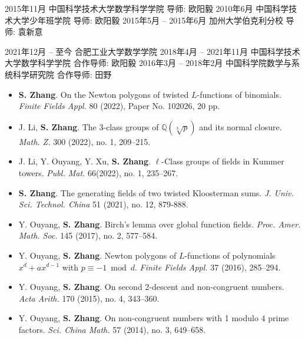 \documentclass[11pt,a4paper]{article}
\begin{document}


	{2015年11月}
	{中国科学技术大学数学科学学院}
	{导师: 欧阳毅}
	{2010年6月}
	{中国科学技术大学少年班学院}
	{导师: 欧阳毅}
	{2015年5月 -- 2015年6月}
	{加州大学伯克利分校}
	{导师: 袁新意}


	{2021年12月 -- 至今}
	{合肥工业大学数学学院}
	{}
	{2018年4月 -- 2021年11月}
	{中国科学技术大学数学科学学院}
	{合作导师: 欧阳毅}
	{2016年3月 -- 2018年2月}
	{中国科学院数学与系统科学研究院}
	{合作导师: 田野}


\begin{itemize}
\item \textbf{S. Zhang}.
On the Newton polygons of twisted $L$-functions of binomials.
{\em Finite Fields Appl.} 80 (2022), Paper No. 102026, 20 pp.

\item J. Li, \textbf{S. Zhang}.
The $3$-class groups of $\mathbb{Q}(\sqrt[3]{p})$ and its normal closure.
{\em Math. Z.} 300 (2022), no. 1, 209--215.

\item J. Li, Y. Ouyang, Y. Xu, \textbf{S. Zhang}.
$\ell$-Class groups of fields in Kummer towers.
{\em Publ. Mat.} 66(2022), no. 1, 235--267.

\item \textbf{S. Zhang}.
The generating fields of two twisted Kloosterman sums.
{\em J. Univ. Sci. Technol. China} 51 (2021), no. 12, 879-888.

\item Y. Ouyang, \textbf{S. Zhang}.
Birch's lemma over global function fields.
{\em Proc. Amer. Math. Soc.} 145 (2017), no. 2, 577--584.

\item Y. Ouyang, \textbf{S. Zhang}.
Newton polygons of $L$-functions of polynomials $x^d+ax^{d-1}$ with $p\equiv -1 \bmod d$.
{\em Finite Fields Appl.} 37 (2016), 285--294.

\item Y. Ouyang, \textbf{S. Zhang}.
On second 2-descent and non-congruent numbers.
{\em Acta Arith.} 170 (2015), no. 4, 343--360.

\item Y. Ouyang, \textbf{S. Zhang}.
On non-congruent numbers with 1 modulo 4 prime factors.
{\em Sci. China Math.} 57 (2014), no. 3, 649--658.
\end{itemize}
\end{document}
